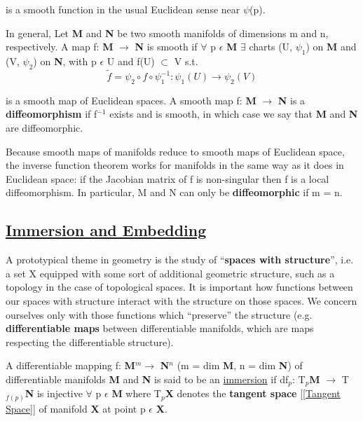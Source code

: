 is a smooth function in the usual Euclidean sense near $\psi$(p).

In general, Let \textbf{M} and \textbf{N} be two smooth manifolds of dimensions m and n, respectively. 
A map f: \textbf{M} $\rightarrow$ \textbf{N} is smooth if $\forall$ p $\epsilon$ \textbf{M} $\exists$ charts (U, $\psi_1$) on \textbf{M} and (V, $\psi_2$) on \textbf{N}, 
with p $\epsilon$ U and f(U) $\subset$ V s.t.
\begin{equation}
    \widetilde{f}= \psi_2 \circ f \circ \psi_1^{-1}:\psi_1(U) \rightarrow \psi_2(V)
\end{equation}

is a smooth map of Euclidean spaces. A smooth map f: \textbf{M} $\rightarrow$ \textbf{N} is a \textbf{diffeomorphism} 
if f$^{-1}$ exists and is smooth, in which case we say that \textbf{M} and \textbf{N} are diffeomorphic.

Because smooth maps of manifolds reduce to smooth maps of Euclidean space, 
the inverse function theorem works for manifolds in the same way as it does in Euclidean space: 
if the Jacobian matrix of f is non-singular then f is a local diffeomorphism. 
In particular, M and N can only be \textbf{diffeomorphic} if m = n.

\subsection{\href{https://mathweb.ucsd.edu/~eizadi/250A-2019/Patrick-Girardet.pdf}{Immersion and Embedding}}
A prototypical theme in geometry is the study of “\textbf{spaces with structure}”, i.e.
a set X equipped with some sort of additional geometric structure, such as a
topology in the case of topological spaces. It is important how
functions between our spaces with structure interact with the structure on those
spaces. We concern ourselves only with those functions which “preserve” the
structure (e.g. \textbf{differentiable maps} between {differentiable manifolds}, 
which are maps respecting the differentiable structure).

A differentiable mapping f: \textbf{M}$^m \rightarrow$ \textbf{N}$^n$ (m = dim \textbf{M}, n = dim \textbf{N})
of differentiable manifolds \textbf{M} and \textbf{N} is said to be an \href{https://en.wikipedia.org/wiki/Immersion_(mathematics)}{immersion}
if df$_p$: T$_p$\textbf{M} $\rightarrow$ T$_{f(p)}$\textbf{N} is injective $\forall$ p $\epsilon$ \textbf{M} where
T$_p$\textbf{X} denotes the \textbf{tangent space} [\ref{Tangent Space}] of manifold \textbf{X} at point p $\epsilon$ \textbf{X}.

